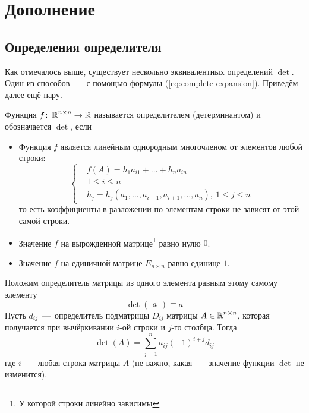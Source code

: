 \documentclass[a4paper,12pt]{article}
\begin{document}
  
  \section{Дополнение}
  
  \subsection{Определения определителя}
  
  Как отмечалось выше, существует нескольно эквивалентных определений $\det$.
  Один из способов~---~с помощью формулы (\ref{eq:complete-expansion}).
  Приведём далее ещё пару.
  
  \begin{definition}
    Функция $f \colon \operatorname{\mathbb R}^{n \times n} \to \operatorname{\mathbb R}$ называется определителем (детерминантом) и обозначается $\det$, если
    \begin{itemize}
      \item Функция $f$ является линейным однородным многочленом от элементов любой строки:
      \[
        \left\{
          \begin{aligned}
            &f(A) = h_1 a_{i1} + \ldots + h_n a_{in}\\
            &1 \leq i \leq n\\
            &h_j = h_j(a_1, \ldots, a_{i-1}, a_{i+1}, \ldots, a_{n}),\ 1 \leq j \leq n
          \end{aligned}
        \right.
      \]
      то есть коэффициенты в разложении по элементам строки не зависят от этой самой строки.
      
      \item Значение $f$ на вырожденной матрице\footnote{У которой строки линейно зависимы} равно нулю $0$.
      \item Значение $f$ на единичной матрице $E_{n \times n}$ равно единице $1$.
    \end{itemize}
  \end{definition}
  
  \begin{definition}
    Положим определитель матрицы из одного элемента равным этому самому элементу
    \[
      \det \begin{pmatrix}a\end{pmatrix} \equiv a
    \]
    Пусть $d_{ij}$~---~определитель подматрицы $D_{ij}$ матрицы $A \in \operatorname{\mathbb R}^{n \times n}$, которая получается при вычёркивании $i$-ой строки и $j$-го столбца.
    Тогда
    \[
      \det(A) = \sum\limits_{j = 1}^n a_{ij} (-1)^{i + j} d_{ij}
    \]
    где $i$~---~любая строка матрицы $A$ (не важно, какая~---~значение функции $\det$ не изменится).
  \end{definition}
  
\end{document}
